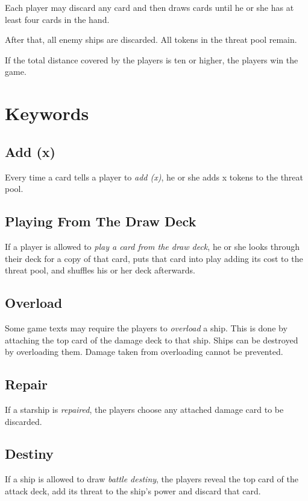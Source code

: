 \documentclass[11pt, a4paper]{article}
\begin{document}
Each player may discard any card and then draws cards until he or she has at
least four cards in the hand.

After that, all enemy ships are discarded. All tokens in the threat pool remain.

If the total distance covered by the players is ten or higher, the players win
the game.

\section{Keywords}
\subsection{Add (x)}
Every time a card tells a player to \emph{add (x)}, he or she adds x tokens to
the threat pool.

\subsection{Playing From The Draw Deck}
If a player is allowed to \emph{play a card from the draw deck}, he or she looks
through their deck for a copy of that card, puts that card into play adding its
cost to the threat pool, and shuffles his or her deck afterwards.

\subsection{Overload}

Some game texts may require the players to \emph{overload} a ship. This is done
by attaching the top card of the damage deck to that ship. Ships can be
destroyed by overloading them. Damage taken from overloading cannot be
prevented.

\subsection{Repair}

If a starship is \emph{repaired}, the players choose any attached damage
card to be discarded.

\subsection{Destiny}

If a ship is allowed to draw \emph{battle destiny}, the players reveal the top
card of the attack deck, add its threat to the ship's power and discard that
card.
\end{document}
